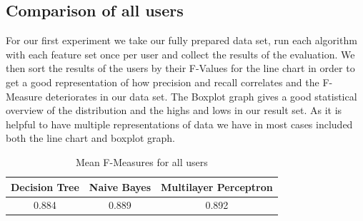 \newpage
\subsection{Comparison of all users}
For our first experiment we take our fully prepared data set, run each algorithm with each feature set once per user and collect the results of the evaluation. We then sort the results of the users by their F-Values for the line chart in order to get a good representation of how precision and recall correlates and the F-Measure deteriorates in our data set. The Boxplot graph gives a good statistical overview of the distribution and the highs and lows in our result set. As it is helpful to have multiple representations of data we have in most cases included both the line chart and boxplot graph.

\begin{table}[H]	
	\begin{center}
		\begin{tabular}{c | c | c}
			Decision Tree & Naive Bayes & Multilayer Perceptron \\
			\hline
			0.884  & 0.889 & 0.892 \\
		\end{tabular}
	\end{center}
	\caption{Mean F-Measures for all users}
	\label{table:f_measures_all_users}
\end{table}

